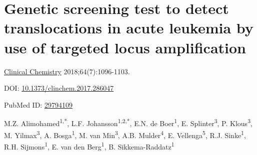 \chapter[Genetic test to detect translocations in acute leukemia using TLA]{Genetic screening test to detect translocations in acute leukemia by use of targeted locus amplification}
\label{chap:TLA}

{ \Large {} }

\hfill \underline{Clinical Chemistry} 2018;64(7):1096-1103.

\hfill DOI: \href{https://doi.org/10.1373/clinchem.2017.286047}{10.1373/clinchem.2017.286047}

\hfill PubMed ID: \href{https://www.ncbi.nlm.nih.gov/pubmed/29794109}{29794109}

\newpage

\noindent
M.Z. Alimohamed\textsuperscript{1,*}, L.F. Johansson\textsuperscript{1,2,*}, E.N. de Boer\textsuperscript{1}, E. Splinter\textsuperscript{3}, P. Klous\textsuperscript{3}, M. Yilmax\textsuperscript{3}, A. Bosga\textsuperscript{1}, M. van Min\textsuperscript{3}, A.B. Mulder\textsuperscript{4}, E. Vellenga\textsuperscript{5}, R.J. Sinke\textsuperscript{1}, R.H. Sijmons\textsuperscript{1}, E. van den Berg\textsuperscript{1}, B. Sikkema-Raddatz\textsuperscript{1}  \\

